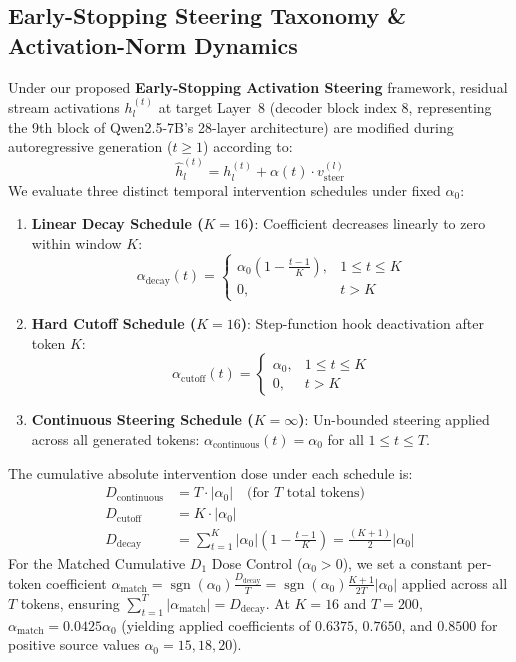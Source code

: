 \subsection{Early-Stopping Steering Taxonomy \& Activation-Norm Dynamics}
Under our proposed \textbf{Early-Stopping Activation Steering} framework, residual stream activations $h_l^{(t)}$ at target Layer~8 (decoder block index 8, representing the 9th block of Qwen2.5-7B's 28-layer architecture) are modified during autoregressive generation ($t \ge 1$) according to:
\begin{equation}
\hat{h}_l^{(t)} = h_l^{(t)} + \alpha(t) \cdot v_{\text{steer}}^{(l)}
\end{equation}
We evaluate three distinct temporal intervention schedules under fixed $\alpha_0$:
\begin{enumerate}
    \item \textbf{Linear Decay Schedule ($K=16$)}: Coefficient decreases linearly to zero within window $K$:
    \begin{equation}
    \alpha_{\text{decay}}(t) = \begin{cases} \alpha_0 \left(1 - \frac{t-1}{K}\right), & 1 \le t \le K \\ 0, & t > K \end{cases}
    \end{equation}
    \item \textbf{Hard Cutoff Schedule ($K=16$)}: Step-function hook deactivation after token $K$:
    \begin{equation}
    \alpha_{\text{cutoff}}(t) = \begin{cases} \alpha_0, & 1 \le t \le K \\ 0, & t > K \end{cases}
    \end{equation}
    \item \textbf{Continuous Steering Schedule ($K=\infty$)}: Un-bounded steering applied across all generated tokens: $\alpha_{\text{continuous}}(t) = \alpha_0$ for all $1 \le t \le T$.
\end{enumerate}

The cumulative absolute intervention dose under each schedule is:
\begin{align}
D_{\text{continuous}} &= T \cdot |\alpha_0| \quad \text{(for $T$ total tokens)} \\
D_{\text{cutoff}} &= K \cdot |\alpha_0| \\
D_{\text{decay}} &= \sum_{t=1}^{K} |\alpha_0|\left(1 - \frac{t-1}{K}\right) = \frac{(K+1)}{2}|\alpha_0|
\end{align}
For the Matched Cumulative $D_1$ Dose Control ($\alpha_0 > 0$), we set a constant per-token coefficient $\alpha_{\text{match}} = \operatorname{sgn}(\alpha_0)\frac{D_{\text{decay}}}{T} = \operatorname{sgn}(\alpha_0)\frac{K+1}{2T}|\alpha_0|$ applied across all $T$ tokens, ensuring $\sum_{t=1}^T |\alpha_{\text{match}}| = D_{\text{decay}}$. At $K=16$ and $T=200$, $\alpha_{\text{match}} = 0.0425 \alpha_0$ (yielding applied coefficients of $0.6375$, $0.7650$, and $0.8500$ for positive source values $\alpha_0 = 15, 18, 20$).

